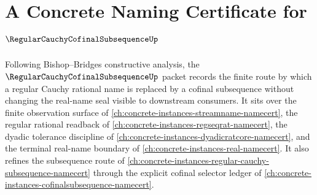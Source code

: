 \chapter{A Concrete Naming Certificate for $\RegularCauchyCofinalSubsequenceUp$}
\label{ch:concrete-instances-regular-cauchy-cofinal-subsequence-namecert}

Following Bishop--Bridges constructive analysis, the $\RegularCauchyCofinalSubsequenceUp$ packet records the finite route by which a regular Cauchy rational name is replaced by a cofinal subsequence without changing the real-name seal visible to downstream consumers. It sits over the finite observation surface of \autoref{ch:concrete-instances-streamname-namecert}, the regular rational readback of \autoref{ch:concrete-instances-regseqrat-namecert}, the dyadic tolerance discipline of \autoref{ch:concrete-instances-dyadicratcore-namecert}, and the terminal real-name boundary of \autoref{ch:concrete-instances-real-namecert}. It also refines the subsequence route of \autoref{ch:concrete-instances-regular-cauchy-subsequence-namecert} through the explicit cofinal selector ledger of \autoref{ch:concrete-instances-cofinalsubsequence-namecert}.

